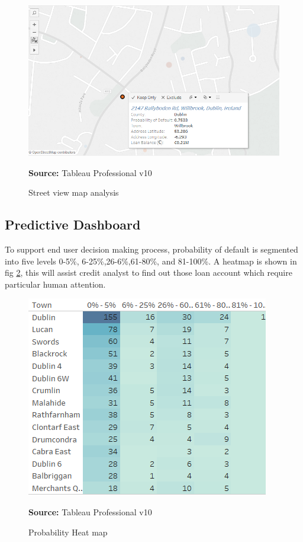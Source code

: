 \begin{center}
\begin{figure}[!htb]
\includegraphics[width=\textwidth]{street.png}
\centering
\caption{Street view map analysis}{\textbf{Source:} Tableau Professional v10}
\label{fig:street}
\end{figure}
\end{center}

\subsection{Predictive Dashboard}

To support end user decision making process, probability of default is segmented into five levels 0-5\%, 6-25\%,26-6\%,61-80\%, and 81-100\%. A heatmap is shown in fig \ref{fig:heatmap}, this will assist credit analyst to find out those loan account which require particular human attention.

\begin{center}
\begin{figure}[!htb]
\includegraphics[width=\textwidth]{heatmap.png}
\centering
\caption{Probability Heat map}{\textbf{Source:} Tableau Professional v10}
\label{fig:heatmap}
\end{figure}
\end{center}

